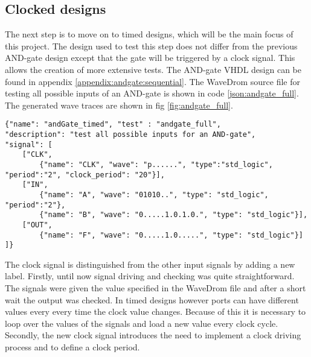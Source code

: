 \subsection{Clocked designs}
The next step is to move on to timed designs, which will be the main focus of this project. The design used to test this step does not differ from the previous AND-gate design except that the gate will be triggered by a clock signal. This allows the creation of more extensive tests. The AND-gate VHDL design can be found in appendix \ref{appendix:andgate:sequential}.
\npar
The WaveDrom source file for testing all possible inputs of an AND-gate is shown in code \ref{json:andgate_full}. The generated wave traces are shown in fig \ref{fig:andgate_full}.
\begin{lstlisting}[style=json, caption={JSON source file for a full AND-gate test}, label={json:andgate_full}]
{"name": "andGate_timed", "test" : "andgate_full", 
"description": "test all possible inputs for an AND-gate", 
"signal": [
	["CLK",
		{"name": "CLK", "wave": "p......", "type":"std_logic", "period":"2", "clock_period": "20"}],
	["IN",
		{"name": "A", "wave": "01010..", "type": "std_logic", "period":"2"},
		{"name": "B", "wave": "0.....1.0.1.0.", "type": "std_logic"}],
	["OUT",
		{"name": "F", "wave": "0.....1.0.....", "type": "std_logic"}]
]}
\end{lstlisting}\clearpage
{}\noindent
The clock signal is distinguished from the other input signals by adding a new label.
\npar
Firstly, until now signal driving and checking was quite straightforward. The signals were given the value specified in the WaveDrom file and after a short wait the output was checked. In timed designs however ports can have different values every every time the clock value changes. Because of this it is necessary to loop over the values of the signals and load a new value every clock cycle.
\npar
Secondly, the new clock signal introduces the need to implement a clock driving process and to define a clock period. 
